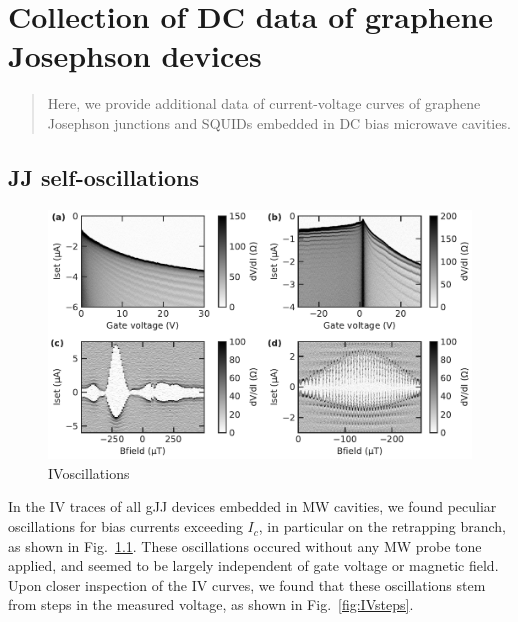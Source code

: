 \newchapstyle
\chapter{Collection of DC data of graphene Josephson devices}
\label{chap:gJJ-misc}

%
%
\begin{abstract}
	\color{title}
	Here, we provide additional data of current-voltage curves of graphene Josephson junctions and SQUIDs embedded in DC bias microwave cavities.
\end{abstract}

\afterpage{\pagecolor{none}}\newpage

\section{JJ self-oscillations}\label{sec:fiske}

\begin{figure}[b]
	\centering
	\includegraphics[width=\linewidth]{appendix/gJJ-misc-figs/fig_IVosc}
	\caption{IVoscillations}
	\label{fig:IVoscillations}
\end{figure}

In the IV traces of all gJJ devices embedded in MW cavities, we found peculiar oscillations for bias currents exceeding $I_c$, in particular on the retrapping branch, as shown in Fig.~\ref{fig:IVoscillations}.
%
These oscillations occured without any MW probe tone applied, and seemed to be largely independent of gate voltage or magnetic field.
%
Upon closer inspection of the IV curves, we found that these oscillations stem from steps in the measured voltage, as shown in Fig.~\ref{fig:IVsteps}.

